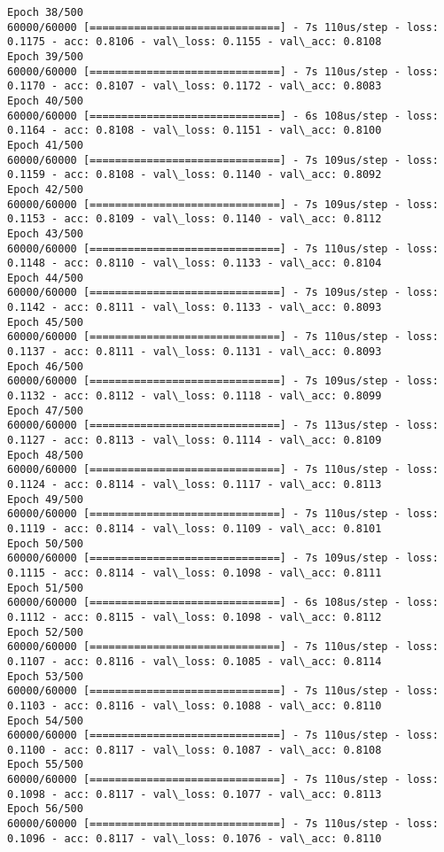 \documentclass[11pt]{article}
\begin{document}
\begin{Verbatim}[commandchars=\\\{\}]
Epoch 38/500
60000/60000 [==============================] - 7s 110us/step - loss: 0.1175 - acc: 0.8106 - val\_loss: 0.1155 - val\_acc: 0.8108
Epoch 39/500
60000/60000 [==============================] - 7s 110us/step - loss: 0.1170 - acc: 0.8107 - val\_loss: 0.1172 - val\_acc: 0.8083
Epoch 40/500
60000/60000 [==============================] - 6s 108us/step - loss: 0.1164 - acc: 0.8108 - val\_loss: 0.1151 - val\_acc: 0.8100
Epoch 41/500
60000/60000 [==============================] - 7s 109us/step - loss: 0.1159 - acc: 0.8108 - val\_loss: 0.1140 - val\_acc: 0.8092
Epoch 42/500
60000/60000 [==============================] - 7s 109us/step - loss: 0.1153 - acc: 0.8109 - val\_loss: 0.1140 - val\_acc: 0.8112
Epoch 43/500
60000/60000 [==============================] - 7s 110us/step - loss: 0.1148 - acc: 0.8110 - val\_loss: 0.1133 - val\_acc: 0.8104
Epoch 44/500
60000/60000 [==============================] - 7s 109us/step - loss: 0.1142 - acc: 0.8111 - val\_loss: 0.1133 - val\_acc: 0.8093
Epoch 45/500
60000/60000 [==============================] - 7s 110us/step - loss: 0.1137 - acc: 0.8111 - val\_loss: 0.1131 - val\_acc: 0.8093
Epoch 46/500
60000/60000 [==============================] - 7s 109us/step - loss: 0.1132 - acc: 0.8112 - val\_loss: 0.1118 - val\_acc: 0.8099
Epoch 47/500
60000/60000 [==============================] - 7s 113us/step - loss: 0.1127 - acc: 0.8113 - val\_loss: 0.1114 - val\_acc: 0.8109
Epoch 48/500
60000/60000 [==============================] - 7s 110us/step - loss: 0.1124 - acc: 0.8114 - val\_loss: 0.1117 - val\_acc: 0.8113
Epoch 49/500
60000/60000 [==============================] - 7s 110us/step - loss: 0.1119 - acc: 0.8114 - val\_loss: 0.1109 - val\_acc: 0.8101
Epoch 50/500
60000/60000 [==============================] - 7s 109us/step - loss: 0.1115 - acc: 0.8114 - val\_loss: 0.1098 - val\_acc: 0.8111
Epoch 51/500
60000/60000 [==============================] - 6s 108us/step - loss: 0.1112 - acc: 0.8115 - val\_loss: 0.1098 - val\_acc: 0.8112
Epoch 52/500
60000/60000 [==============================] - 7s 110us/step - loss: 0.1107 - acc: 0.8116 - val\_loss: 0.1085 - val\_acc: 0.8114
Epoch 53/500
60000/60000 [==============================] - 7s 110us/step - loss: 0.1103 - acc: 0.8116 - val\_loss: 0.1088 - val\_acc: 0.8110
Epoch 54/500
60000/60000 [==============================] - 7s 110us/step - loss: 0.1100 - acc: 0.8117 - val\_loss: 0.1087 - val\_acc: 0.8108
Epoch 55/500
60000/60000 [==============================] - 7s 110us/step - loss: 0.1098 - acc: 0.8117 - val\_loss: 0.1077 - val\_acc: 0.8113
Epoch 56/500
60000/60000 [==============================] - 7s 110us/step - loss: 0.1096 - acc: 0.8117 - val\_loss: 0.1076 - val\_acc: 0.8110

\end{Verbatim}
\end{document}
